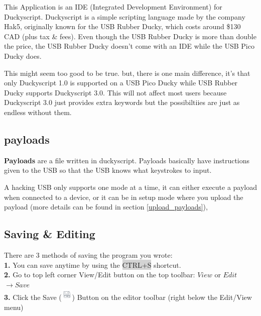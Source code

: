 \documentclass[a4paper,12pt]{article}
\begin{document}
This Application is an IDE (Integrated Development Environment) for Duckyscript. Duckyscript is a simple scripting language made by the company Hak5, originally known for the USB Rubber Ducky, which costs around \$130 CAD (plus tax \& fees).
Even though the USB Rubber Ducky is more than double the price, the USB Rubber Ducky doesn't come with an IDE while the USB Pico Ducky does.

This might seem too good to be true. but, there is one main difference,
it's that only Duckyscript 1.0 is supported on a USB Pico Ducky while USB Rubber Ducky supports Duckyscript 3.0. This will not affect most users because Duckyscript 3.0 just provides extra keywords but the possibiltiies are just as endless without them.

\subsection{payloads}

\textbf{Payloads} are a file written in duckyscript. Payloads basically have instructions given to the USB so that the USB knows what keystrokes to input.

A hacking USB only supports one mode at a time, it can either execute a payload when connected to a device, or it can be in setup mode where you upload the payload (more details can be found in section \ref{upload_payloads}), 

\subsection{Saving \& Editing}\label{save_edit}

There are 3 methods of saving the program you wrote:
\\\textbf{1.} You can save anytime by using the \colorbox{lightgray}{CTRL+S} shortcut. 
\\\textbf{2.} Go to top left corner View/Edit button on the top toolbar: $View$ or $Edit$ $\rightarrow Save$
\\\textbf{3.} Click the Save (\includegraphics[width=5.5mm]{pictures/black_bk/save.png}) Button on the editor toolbar (right below the Edit/View menu)
\end{document}
